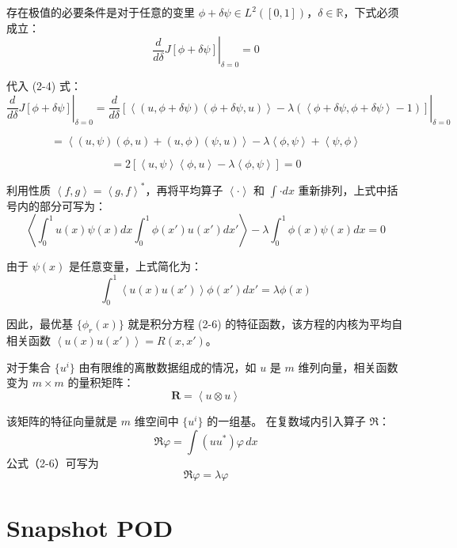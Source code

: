 存在极值的必要条件是对于任意的变里 \(\phi + \delta \psi \in L^2([0,1])\)，\(\delta \in \mathbb{R}\)，下式必须成立：
\begin{equation}
\left. \frac{d}{d\delta} J[\phi + \delta \psi] \right|_{\delta = 0} = 0 \tag{2-5}
\end{equation}

代入 (2-4) 式：
\[
\left. \frac{d}{d\delta} J[\phi + \delta \psi] \right|_{\delta = 0} = \left. \frac{d}{d\delta} \left[ \left\langle \left( u, \phi + \delta \psi \right) \left( \phi + \delta \psi, u \right) \right\rangle - \lambda \left( \left\langle \phi + \delta \psi, \phi + \delta \psi \right\rangle - 1 \right) \right] \right|_{\delta = 0}
\]

\[
= \left\langle \left( u, \psi \right) \left( \phi, u \right) + \left( u, \phi \right) \left( \psi, u \right) \right\rangle - \lambda \left\langle \phi, \psi \right\rangle + \left\langle \psi, \phi \right\rangle
\]

\[
= 2 \left[ \left\langle u, \psi \right\rangle \left\langle \phi, u \right\rangle - \lambda \left\langle \phi, \psi \right\rangle \right] = 0
\]

利用性质 \(\left\langle f, g \right\rangle = \left\langle g, f \right\rangle^*\)，再将平均算子 \(\left\langle \cdot \right\rangle\) 和 \(\int \cdot dx\) 重新排列，上式中括号内的部分可写为：
\[
\left\langle \int_0^1 u(x) \psi(x) dx \int_0^1 \phi(x') u(x') dx' \right\rangle - \lambda \int_0^1 \phi(x) \psi(x) dx = 0
\]

由于 \(\psi(x)\) 是任意变量，上式简化为：
\begin{equation}
\int_0^1 \left\langle u(x) u(x') \right\rangle \phi(x') dx' = \lambda \phi(x) \tag{2-6}
\end{equation}

因此，最优基 \(\{\phi_r(x)\}\) 就是积分方程 (2-6) 的特征函数，该方程的内核为平均自相关函数 \(\left\langle u(x) u(x') \right\rangle = R(x, x')\)。

对于集合 \(\{u^i\}\) 由有限维的离散数据组成的情况，如 \(u\) 是 \(m\) 维列向量，相关函数变为 \(m \times m\) 的量积矩阵：
\[
\mathbf{R} = \left\langle u \otimes u \right\rangle
\]

该矩阵的特征向量就是 \(m\) 维空间中 \(\{u^i\}\) 的一组基。
在复数域内引入算子 $\mathfrak{R}$：
\[
\mathfrak{R}\varphi = \int (u u^*) \varphi \, dx
\]
公式（2-6）可写为
\begin{equation}
\mathfrak{R}\varphi = \lambda \varphi \tag{2-7}
\end{equation}
\section{Snapshot POD}

